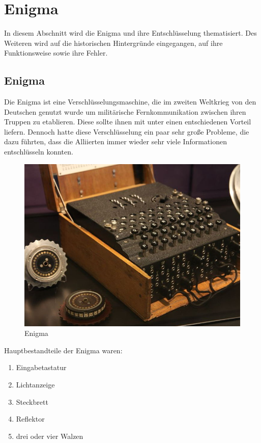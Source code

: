 \section{Enigma}
\label{enigma}
In diesem Abschnitt wird die Enigma und ihre Entschlüsselung thematisiert. Des Weiteren wird auf die historischen Hintergründe eingegangen, auf ihre Funktionsweise sowie ihre Fehler.

\subsection{Enigma}
Die Enigma ist eine Verschlüsselungsmaschine, die im zweiten Weltkrieg von den Deutschen genutzt wurde um militärische Fernkommunikation zwischen ihren Truppen zu etablieren. Diese sollte ihnen mit unter einen entschiedenen Vorteil liefern. Dennoch hatte diese Verschlüsselung ein paar sehr große Probleme, die dazu führten, dass die Alliierten immer wieder sehr viele Informationen entschlüsseln konnten.\\
\begin{figure}
\includegraphics[scale=0.3]{enigma.jpg}
\caption{Enigma}
\label{fig:enigmaset}
\end{figure}
Hauptbestandteile der Enigma waren:
\begin{enumerate}
	\item Eingabetastatur
	\item Lichtanzeige
	\item Steckbrett
	\item Reflektor
	\item drei oder vier Walzen
\end{enumerate}

